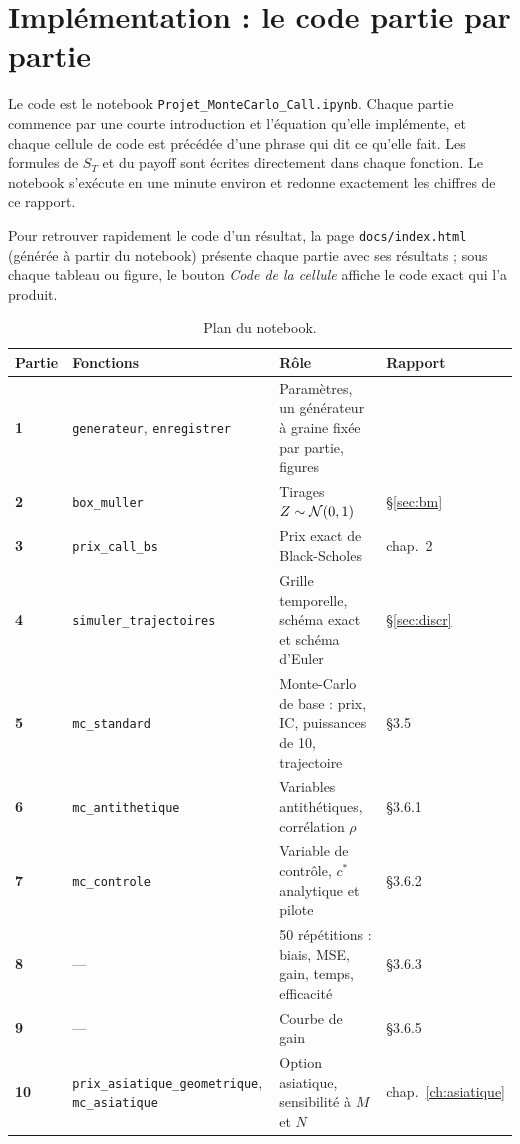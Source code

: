 \chapter{Implémentation : le code partie par partie}

Le code est le notebook \texttt{Projet\_MonteCarlo\_Call.ipynb}. Chaque partie commence par une courte introduction et l'équation qu'elle implémente, et chaque cellule de code est précédée d'une phrase qui dit ce qu'elle fait. Les formules de $S_T$ et du payoff sont écrites directement dans chaque fonction. Le notebook s'exécute en une minute environ et redonne exactement les chiffres de ce rapport.

Pour retrouver rapidement le code d'un résultat, la page \texttt{docs/index.html} (générée à partir du notebook) présente chaque partie avec ses résultats ; sous chaque tableau ou figure, le bouton \emph{Code de la cellule} affiche le code exact qui l'a produit.

\begin{table}[H]
\centering\small
\begin{tabularx}{\textwidth}{>{\bfseries}p{1cm}p{5.4cm}Lp{1.6cm}}
\toprule
Partie & Fonctions & Rôle & Rapport \\
 & \texttt{generateur}, \texttt{enregistrer} & Paramètres, un générateur à graine fixée par partie, figures & \\
2 & \texttt{box\_muller} & Tirages $Z\sim\mathcal{N}(0,1)$ & §\ref{sec:bm} \\
3 & \texttt{prix\_call\_bs} & Prix exact de Black-Scholes & chap.~2 \\
4 & \texttt{simuler\_trajectoires} & Grille temporelle, schéma exact et schéma d'Euler & §\ref{sec:discr} \\
5 & \texttt{mc\_standard} & Monte-Carlo de base : prix, IC, puissances de 10, trajectoire & §3.5 \\
6 & \texttt{mc\_antithetique} & Variables antithétiques, corrélation $\rho$ & §3.6.1 \\
7 & \texttt{mc\_controle} & Variable de contrôle, $c^*$ analytique et pilote & §3.6.2 \\
8 & --- & 50 répétitions : biais, MSE, gain, temps, efficacité & §3.6.3 \\
9 & --- & Courbe de gain & §3.6.5 \\
10 & \texttt{prix\_asiatique\_geometrique}, \texttt{mc\_asiatique} & Option asiatique, sensibilité à $M$ et $N$ & chap.~\ref{ch:asiatique} \\
\bottomrule
\end{tabularx}
\caption{Plan du notebook.}
\end{table}


